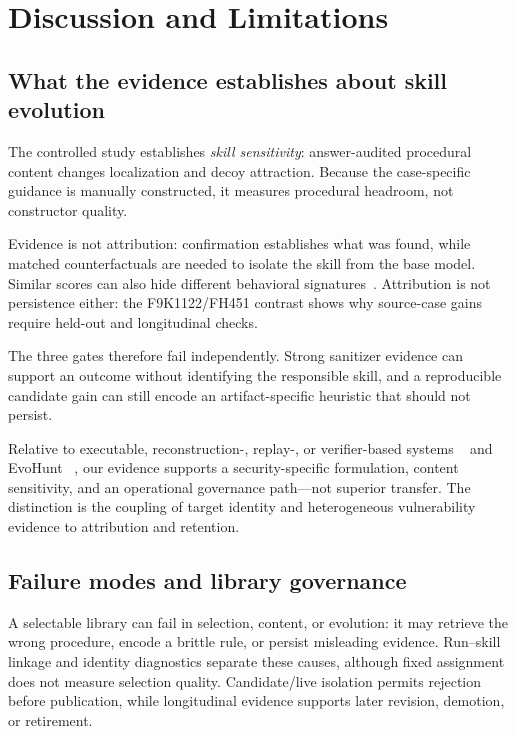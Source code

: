 \documentclass[11pt]{article}
\begin{document}
\section{Discussion and Limitations}
\label{sec:discussion}

\subsection{What the evidence establishes about skill evolution}

The controlled study establishes \emph{skill sensitivity}: answer-audited procedural
content changes localization and decoy attraction.  Because the case-specific guidance
is manually constructed, it measures procedural headroom, not constructor quality.

Evidence is not attribution: confirmation establishes what was found, while matched
counterfactuals are needed to isolate the skill from the base model.  Similar scores can
also hide different behavioral signatures~\cite{trajectoryprograms}.  Attribution is not
persistence either: the F9K1122/FH451 contrast shows why source-case gains require
held-out and longitudinal checks.

The three gates therefore fail independently.  Strong sanitizer evidence can support an
outcome without identifying the responsible skill, and a reproducible candidate gain can
still encode an artifact-specific heuristic that should not persist.

Relative to executable, reconstruction-, replay-, or verifier-based systems
~\cite{asi,mindskill,skillcommit,coevoskills,trace2skilleda,skillforge} and EvoHunt
~\cite{evohunt}, our evidence supports a security-specific formulation, content
sensitivity, and an operational governance path---not superior transfer.  The distinction
is the coupling of target identity and heterogeneous vulnerability evidence to
attribution and retention.

\subsection{Failure modes and library governance}

A selectable library can fail in selection, content, or evolution: it may retrieve the
wrong procedure, encode a brittle rule, or persist misleading evidence.  Run--skill
linkage and identity diagnostics separate these causes, although fixed assignment does
not measure selection quality.  Candidate/live isolation permits rejection before
publication, while longitudinal evidence supports later revision, demotion, or retirement.
\end{document}

